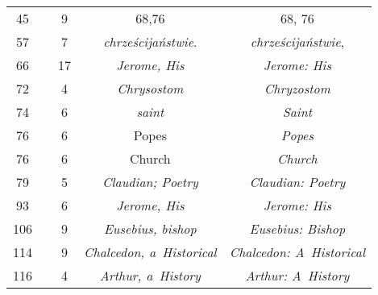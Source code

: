 \documentclass[a4paper,11pt]{article}
\begin{document}
\begin{center}
\begin{tabular}{|c|c|c|c|c|}
    45  & &  9 & 68,76 & 68, 76 \\
    57  & &  7 & \emph{chrześcijaństwie}. & \emph{chrześcijaństwie}, \\
    66  & & 17 & \emph{Jerome, His} & \emph{Jerome: His} \\
    72  & &  4 & \emph{Chrysostom} & \emph{Chryzostom} \\
    74  & &  6 & \emph{saint} & \emph{Saint} \\
    76  & &  6 & Popes & \emph{Popes} \\
    76  & &  6 & Church & \emph{Church} \\
    79  & &  5 & \emph{Claudian; Poetry} & \emph{Claudian: Poetry} \\
    93  & &  6 & \emph{Jerome, His} & \emph{Jerome: His} \\
    106 & &  9 & \emph{Eusebius, bishop} & \emph{Eusebius: Bishop} \\
    114 & &  9 & \emph{Chalcedon, a~Historical}
           & \emph{Chalcedon: A~Historical} \\
    116 & &  4 & \emph{Arthur, a~History} & \emph{Arthur: A~History} \\
    \hline
  \end{tabular}



\end{center}
\end{document}
